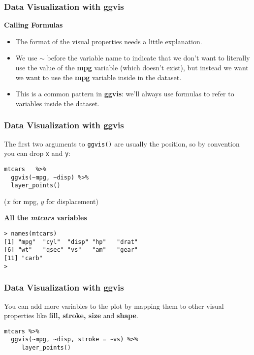 \documentclass[MASTER.tex]{subfiles}
\begin{document}
\begin{frame}
\frametitle{Data Visualization with ggvis}

\Large
\textbf{Calling Formulas}
\begin{itemize}
\item The format of the visual properties needs a little explanation. 
\item We use $\sim$ before the variable name to indicate that we don’t want to literally use the value of the \textbf{mpg} variable (which doesn’t exist), but instead we want we want to use the \textbf{mpg} variable inside in the dataset. 
\item This is a common pattern in \textbf{ggvis}: we’ll always use formulas to refer to variables inside the dataset.

\end{itemize}
\end{frame}

\begin{frame}[fragile]
	\frametitle{Data Visualization with ggvis}

\Large

The first two arguments to \texttt{ggvis()} are usually the position, so by convention you can drop \texttt{x} and \texttt{y}:
\begin{framed}
	\begin{verbatim}
mtcars   %>% 
  ggvis(~mpg, ~disp) %>% 
  layer_points()
\end{verbatim}
\end{framed}
($x$ for mpg, $y$ for displacement)
\end{frame}
\begin{frame}[fragile]
	\Large
\textbf{All the \textit{mtcars} variables}

\begin{framed}
\begin{verbatim}
> names(mtcars)
[1] "mpg"  "cyl"  "disp" "hp"   "drat"
[6] "wt"   "qsec" "vs"   "am"   "gear"
[11] "carb"
> 
\end{verbatim}
\end{framed}

\end{frame}
\begin{frame}[fragile]
	\frametitle{Data Visualization with ggvis}
\Large	
You can add more variables to the plot by mapping them to other visual properties like \textbf{fill, stroke, size} and \textbf{shape}.
{
	\large
\begin{framed}
	\begin{verbatim}
mtcars %>% 
  ggvis(~mpg, ~disp, stroke = ~vs) %>% 
     layer_points()
\end{verbatim}
\end{framed}
}

\end{frame}
\end{document}

